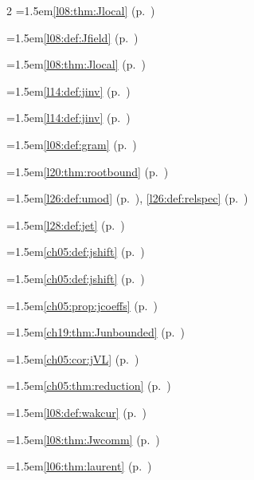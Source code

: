 \begin{multicols}{2}
\hangindent=1.5em\quad \ref{l08:thm:Jlocal} (p.~\pageref{l08:thm:Jlocal})\par
\hangindent=1.5em\quad \ref{l08:def:Jfield} (p.~\pageref{l08:def:Jfield})\par
\hangindent=1.5em\quad \ref{l08:thm:Jlocal} (p.~\pageref{l08:thm:Jlocal})\par
\hangindent=1.5em\quad \ref{l14:def:jinv} (p.~\pageref{l14:def:jinv})\par
\hangindent=1.5em\quad \ref{l14:def:jinv} (p.~\pageref{l14:def:jinv})\par
\hangindent=1.5em\quad \ref{l08:def:gram} (p.~\pageref{l08:def:gram})\par
\hangindent=1.5em\quad \ref{l20:thm:rootbound} (p.~\pageref{l20:thm:rootbound})\par
\hangindent=1.5em\quad \ref{l26:def:umod} (p.~\pageref{l26:def:umod}), \ref{l26:def:relspec} (p.~\pageref{l26:def:relspec})\par
\hangindent=1.5em\quad \ref{l28:def:jet} (p.~\pageref{l28:def:jet})\par
\hangindent=1.5em\quad \ref{ch05:def:jshift} (p.~\pageref{ch05:def:jshift})\par
\hangindent=1.5em\quad \ref{ch05:def:jshift} (p.~\pageref{ch05:def:jshift})\par
\hangindent=1.5em\quad \ref{ch05:prop:jcoeffs} (p.~\pageref{ch05:prop:jcoeffs})\par
\hangindent=1.5em\quad \ref{ch19:thm:Junbounded} (p.~\pageref{ch19:thm:Junbounded})\par
\hangindent=1.5em\quad \ref{ch05:cor:jVL} (p.~\pageref{ch05:cor:jVL})\par
\hangindent=1.5em\quad \ref{ch05:thm:reduction} (p.~\pageref{ch05:thm:reduction})\par
\hangindent=1.5em\quad \ref{l08:def:wakcur} (p.~\pageref{l08:def:wakcur})\par
\hangindent=1.5em\quad \ref{l08:thm:Jwcomm} (p.~\pageref{l08:thm:Jwcomm})\par
\par{}\par\nopagebreak\smallskip
\hangindent=1.5em\quad \ref{l06:thm:laurent} (p.~\pageref{l06:thm:laurent})\par

\end{multicols}
